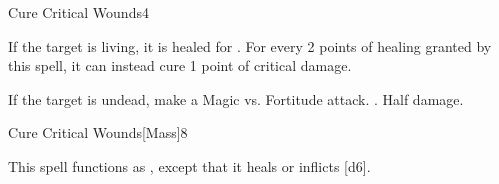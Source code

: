 \begin{spellsection}{Cure Critical Wounds}{4}
\begin{spellheader}
\end{spellheader}
\begin{spellcontent}
    \begin{spelltargetinginfo}
    \end{spelltargetinginfo}
    \begin{spelleffects}
        \spelleffect If the target is living, it is healed for . For every 2 points of healing granted by this spell, it can instead cure 1 point of critical damage.
        \begin{spellattacktriggered}{If the target is undead, make a Magic vs. Fortitude attack.}
            \spellsuccess {}.
            \spellfailure Half damage.
        \end{spellattacktriggered}
    \end{spelleffects}
\end{spellcontent}
\begin{spellfooter}
\end{spellfooter}
\end{spellsection}

\begin{spellsection}{Cure Critical Wounds}[Mass]{8}
\begin{spellheader}
\end{spellheader}
\begin{spellcontent}
    \begin{spelltargetinginfo}
    \end{spelltargetinginfo}
    \begin{spelleffects}
        \spellspecial This spell functions as , except that it heals or inflicts [d6].
    \end{spelleffects}
\end{spellcontent}
\begin{spellfooter}
\end{spellfooter}
\end{spellsection}

